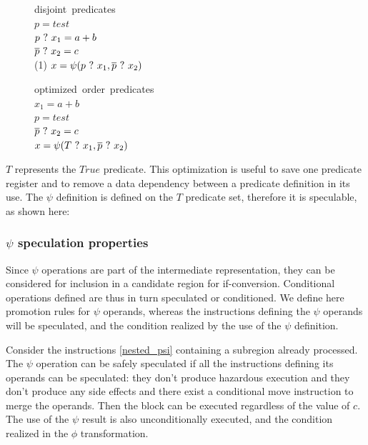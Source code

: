 \begin{figure}
\footnotesize
\begin{minipage}[t]{4cm}
\mbox{disjoint predicates} \\
$ p = test $ \\
$ p ~?~ x_1 = a + b $ \\
$ \overline{p} ~?~ x_2 = c $ \\
(1) $ x = \psi(p ~?~ x_1, \overline{p} ~?~ x_2) $ \\
\end{minipage}
\begin{minipage}[t]{4cm}
\mbox{optimized order predicates} \\
$ x_1 = a + b $ \\
$ p = test $ \\
$ \overline{p} ~?~ x_2 = c $ \\
$ x = \psi(T ~?~ x_1, \overline{p} ~?~ x_2) $ \\
\end{minipage}
\end{figure}

$T$ represents the $True$ predicate. This optimization is useful to save one predicate register and to remove a data dependency between a predicate definition in its use. 
The $\psi$ definition is defined on the $T$ predicate set, therefore it is speculable, as shown here:

\subsubsection{$\psi$ speculation properties}

Since $\psi$ operations are part of the intermediate representation, they can be considered for inclusion in a candidate region for if-conversion. Conditional operations defined are thus in turn speculated or conditioned. We define here promotion rules for $\psi$ operands, whereas the instructions defining the $\psi$ operands will be speculated, and the condition realized by the use of the $\psi$ definition.

Consider the instructions \ref{nested_psi} containing a subregion already processed. The $\psi$ operation can be safely speculated if all the instructions defining its operands can be speculated: they don't produce hazardous execution and they don't produce any side effects and there exist a conditional move instruction to merge the operands. Then the block can be executed regardless of the value of $c$. The use of the $\psi$ result is also unconditionally executed, and the condition realized in the $\phi$ transformation.

